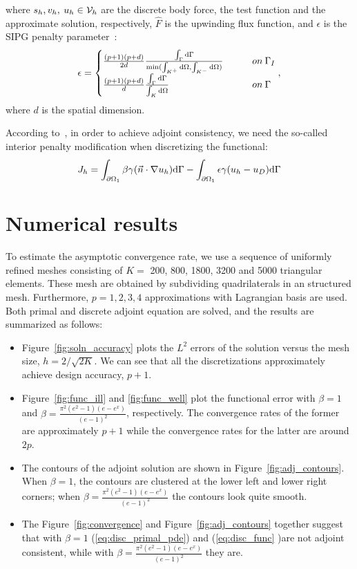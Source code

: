 \documentclass[a4paper]{article}
\begin{document}
where $s_h, v_h,\:u_h\in \mathcal{V}_h$ are the discrete body force, the test function and the approximate solution, respectively, $\hat{F}$ is the upwinding flux function, and $\epsilon$ is the SIPG penalty parameter~\cite{Shahbazi2005}:
\begin{equation}\label{eq:disc_func}
\begin{aligned}
\epsilon = 
\begin{cases}
\frac{(p+1)(p+d)}{2d} \frac{ \int_{\Gamma}\mathrm{d}\Gamma }{ \min (\int_{K^+}\mathrm{d}\Omega, \int_{K^-}\mathrm{d}\Omega) }\qquad &on\: \Gamma_I  \\
\frac{(p+1)(p+d)}{d} \frac{ \int_{\Gamma}\mathrm{d}\Gamma }{ \int_{K}\mathrm{d}\Omega }\qquad &on\: \Gamma
\end{cases},
\end{aligned}
\end{equation}
where $d$ is the spatial dimension.

According to~\cite{Hartmann2007}, in order to achieve adjoint consistency, we need the so-called interior penalty modification when discretizing the functional:
\begin{equation}
J_h = \int_{\partial\Omega_{1}}\beta\gamma(\vec{n}\cdot\nabla u_h) \mathrm{d} \Gamma - \int_{\partial\Omega_1}\epsilon \gamma (u_h - u_D) \mathrm{d}\Gamma 
\end{equation}


\section{Numerical results}
To estimate the asymptotic convergence rate, we use a sequence of uniformly refined meshes consisting of $K=$ 200, 800, 1800, 3200 and 5000 triangular elements. These mesh are obtained by subdividing quadrilaterals in an structured mesh. Furthermore, $p=1,2,3,4$ approximations with Lagrangian basis are used. Both primal and discrete adjoint equation are solved, and the results are summarized as follows:
\begin{itemize}
	\item Figure~\ref{fig:soln_accuracy} plots the $L^2$ errors of the solution versus the mesh size, $h = 2/\sqrt{2K}$. We can see that all the discretizations approximately achieve design accuracy, $p+1$.
	\item Figure~\ref{fig:func_ill} and \ref{fig:func_well} plot the functional error with $\beta=1$ and $\beta=\frac{\pi^2(e^2-1)(e-e^x)}{(e-1)^2}$, respectively. The convergence rates of the former are approximately $p+1$ while the convergence rates for the latter are around $2p$. 
	\item The contours of the adjoint solution are shown in Figure~\ref{fig:adj_contours}. When $\beta=1$, the contours are clustered at the lower left and lower right corners; when $\beta=\frac{\pi^2(e^2-1)(e-e^x)}{(e-1)^2}$ the contours look quite smooth.
	\item The Figure~\ref{fig:convergence} and Figure~\ref{fig:adj_contours} together suggest that with $\beta=1$ (\ref{eq:disc_primal_pde}) and (\ref{eq:disc_func} )are not adjoint consistent, while with $\beta=\frac{\pi^2(e^2-1)(e-e^x)}{(e-1)^2}$ they are.
\end{itemize}
\end{document}
